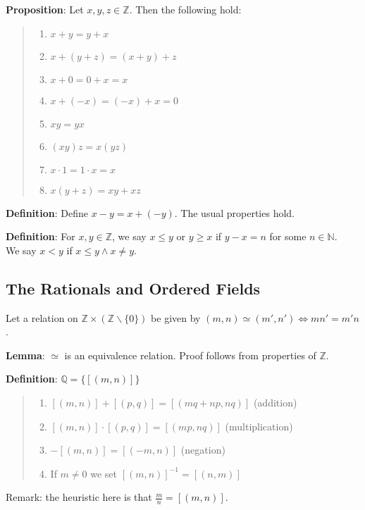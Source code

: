 \documentclass[11pt]{article}
\begin{document}
\textbf{Proposition}: Let $x,y,z \in \mathbb{Z}$. Then the following hold:
\begin{quote}\vspace{-0.3cm}
	\begin{enumerate}
	\item $x + y = y + x$
	\item $x + (y+z) = (x+y) + z$
	\item $x + 0 = 0 + x = x$
	\item $x + (-x) = (-x) + x = 0$
	\item $xy = yx$
	\item $(xy)z = x(yz)$
	\item $x \cdot 1 = 1 \cdot x = x$
	\item $x(y+z) = xy + xz$
	\end{enumerate}
\end{quote}
\textbf{Definition}: Define $x-y = x+ (-y)$. The usual properties hold.

\textbf{Definition}: For $x,y \in \mathbb{Z}$, we say $x \leq y$ or $y \geq x$ if $y - x = n$ for some $n \in \mathbb{N}$.\\
We say $x < y$ if $x \leq y \land x \neq y$.

\subsection{The Rationals and Ordered Fields}

Let a relation on $\mathbb{Z} \times (\mathbb{Z} \backslash \{0\})$ be given by $(m,n) \simeq (m',n') \iff mn' = m'n$.

\textbf{Lemma}: $\simeq$ is an equivalence relation. Proof follows from properties of $\mathbb{Z}$.

\textbf{Definition}: $\mathbb{Q} = \{[(m,n)]\}$
\begin{quote}\vspace{-0.3cm}
	\begin{enumerate}
	\item $[(m,n)] + [(p,q)] = [(mq+np, nq)]$ (addition)
	\item $[(m,n)] \cdot [(p,q)] = [(mp, nq)]$ (multiplication)
	\item $-[(m,n)] = [(-m, n)]$ (negation)
	\item If $m \neq 0$ we set $[(m,n)]^{-1} = [(n,m)]$
	\end{enumerate}
\end{quote}
Remark: the heuristic here is that $\frac{m}{n} = [(m,n)]$.
\end{document}
